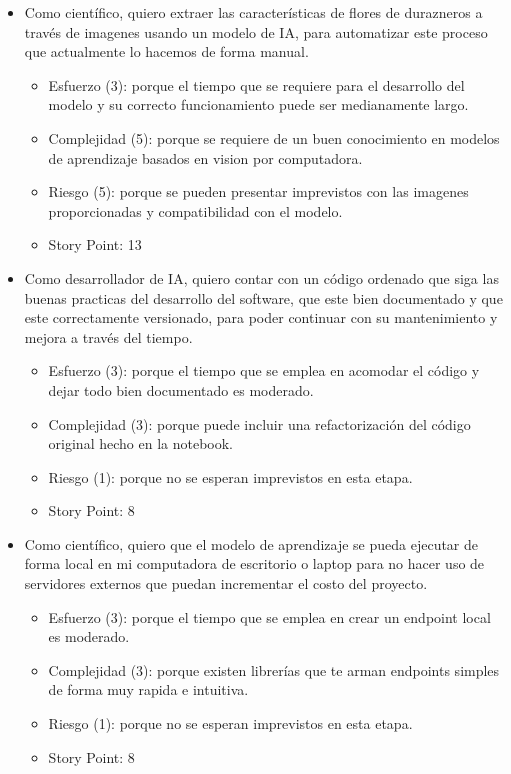 \documentclass[
11pt, %
]{charter}
\begin{document}
\begin{itemize}
	\item Como científico, quiero extraer las características de flores de durazneros a través de imagenes usando un modelo de IA, para automatizar este proceso que actualmente lo hacemos de forma manual.
	\begin{itemize}
	\item Esfuerzo (3): porque el tiempo que se requiere para el desarrollo del modelo y su correcto funcionamiento puede ser medianamente largo.
	\item Complejidad (5): porque se requiere de un buen conocimiento en modelos de aprendizaje basados en vision por computadora. 
	\item Riesgo (5): porque se pueden presentar imprevistos con las imagenes proporcionadas y compatibilidad con el modelo.
	\item Story Point: 13
\end{itemize}
	\item Como desarrollador de IA, quiero contar con un código ordenado que siga las buenas practicas del desarrollo del software, que este bien documentado y que este correctamente versionado, para poder continuar con su mantenimiento y mejora a través del tiempo.
	\begin{itemize}
	\item Esfuerzo (3): porque el tiempo que se emplea en acomodar el código y dejar todo bien documentado es moderado.
	\item Complejidad (3): porque puede incluir una refactorización del código original hecho en la notebook.
	\item Riesgo (1): porque no se esperan imprevistos en esta etapa.
	\item Story Point: 8
\end{itemize}
	\item Como científico, quiero que el modelo de aprendizaje se pueda ejecutar de forma local en mi computadora de escritorio o laptop para no hacer uso de servidores externos que puedan incrementar el costo del proyecto.
	\begin{itemize}
	\item Esfuerzo (3): porque el tiempo que se emplea en crear un endpoint local es moderado.
	\item Complejidad (3): porque existen librerías que te arman endpoints simples de forma muy rapida e intuitiva.
	\item Riesgo (1): porque no se esperan imprevistos en esta etapa.
	\item Story Point: 8
\end{itemize}
\end{itemize}
\end{document}
